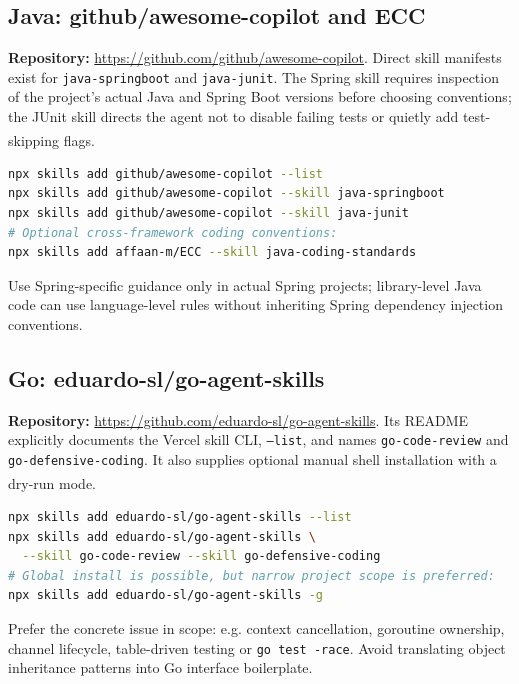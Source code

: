 \documentclass[11pt,letterpaper]{article}
\newcommand{\src}[1]{\textsuperscript{\textcolor{teal}{\cite{#1}}}}
\begin{document}
\subsection{Java: github/awesome-copilot and ECC}
\textbf{Repository:} \url{https://github.com/github/awesome-copilot}. Direct skill manifests exist for \texttt{java-springboot} and \texttt{java-junit}. The Spring skill requires inspection of the project's actual Java and Spring Boot versions before choosing conventions; the JUnit skill directs the agent not to disable failing tests or quietly add test-skipping flags.\src{javaspring,javajunit}
\begin{lstlisting}[language=bash]
npx skills add github/awesome-copilot --list
npx skills add github/awesome-copilot --skill java-springboot
npx skills add github/awesome-copilot --skill java-junit
# Optional cross-framework coding conventions:
npx skills add affaan-m/ECC --skill java-coding-standards
\end{lstlisting}
Use Spring-specific guidance only in actual Spring projects; library-level Java code can use language-level rules without inheriting Spring dependency injection conventions.

\subsection{Go: eduardo-sl/go-agent-skills}
\textbf{Repository:} \url{https://github.com/eduardo-sl/go-agent-skills}. Its README explicitly documents the Vercel skill CLI, \texttt{--list}, and names \texttt{go-code-review} and \texttt{go-defensive-coding}. It also supplies optional manual shell installation with a dry-run mode.\src{goskills}
\begin{lstlisting}[language=bash]
npx skills add eduardo-sl/go-agent-skills --list
npx skills add eduardo-sl/go-agent-skills \
  --skill go-code-review --skill go-defensive-coding
# Global install is possible, but narrow project scope is preferred:
npx skills add eduardo-sl/go-agent-skills -g
\end{lstlisting}
Prefer the concrete issue in scope: e.g. context cancellation, goroutine ownership, channel lifecycle, table-driven testing or \texttt{go test -race}. Avoid translating object inheritance patterns into Go interface boilerplate.
\end{document}
